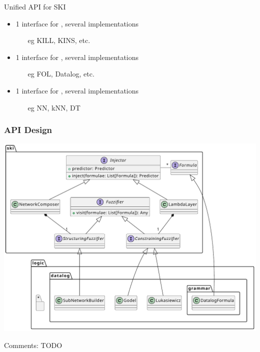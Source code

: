 \documentclass[presentation]{beamer}\mode<presentation>{\usetheme{AMSBolognaFC}}
\begin{document}
\begin{frame}[allowframebreaks]
    \begin{block}{Unified API for SKI}
        \begin{itemize}
            \item 1 interface for , several implementations
            \begin{itemize}
                \item[eg] KILL, KINS, etc.
            \end{itemize}
            \item 1 interface for , several implementations
            \begin{itemize}
                \item[eg] FOL, Datalog, etc.
            \end{itemize}
            \item 1 interface for , several implementations
            \begin{itemize}
                \item[eg] NN, kNN, DT
            \end{itemize}
        \end{itemize}
    \end{block}
\end{frame}

\begin{frame}[allowframebreaks]
\frametitle{API Design}

    \begin{center}
        \includegraphics[width=.7\linewidth]{figures/psyki-class-diagram.pdf}
    \end{center}

    \framebreak

    Comments: TODO
\end{frame}


\end{document}

